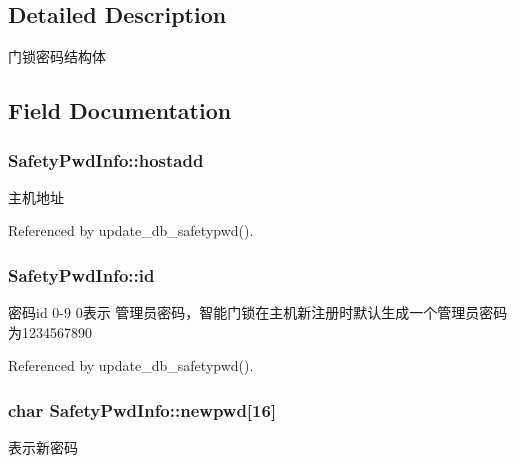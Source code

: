 \subsection{Detailed Description}
门锁密码结构体 

\subsection{Field Documentation}
\hypertarget{structSafetyPwdInfo_a8a63934b72944509aa82673a927cfc71}{
\subsubsection[{hostadd}]{ Safety\-Pwd\-Info\-::hostadd}}\label{structSafetyPwdInfo_a8a63934b72944509aa82673a927cfc71}


主机地址 



Referenced by update\-\_\-db\-\_\-safetypwd().

\hypertarget{structSafetyPwdInfo_a8938447ca6c73166e69798de5cca1547}{
\subsubsection[{id}]{ Safety\-Pwd\-Info\-::id}}\label{structSafetyPwdInfo_a8938447ca6c73166e69798de5cca1547}


密码id 0-\/9 0表示 管理员密码，智能门锁在主机新注册时默认生成一个管理员密码为1234567890 



Referenced by update\-\_\-db\-\_\-safetypwd().

\hypertarget{structSafetyPwdInfo_a1fec5794b06d5a0f401593930d7254b5}{
\subsubsection[{newpwd}]{\setlength{\rightskip}{0pt plus 5cm}char Safety\-Pwd\-Info\-::newpwd\mbox{[}16\mbox{]}}}\label{structSafetyPwdInfo_a1fec5794b06d5a0f401593930d7254b5}


表示新密码 



